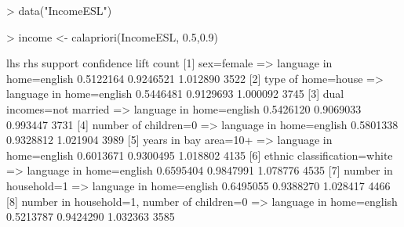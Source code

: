 \documentclass [a4paper] {article}
\begin{document}
\begin{Schunk}
\begin{Sinput}
> data("IncomeESL")
\end{Sinput}
\end{Schunk}
\begin{Schunk}
\begin{Sinput}
> income <- calapriori(IncomeESL, 0.5,0.9)
\end{Sinput}
\begin{Soutput}
    lhs                              rhs                          support confidence     lift count
[1] {sex=female}                  => {language in home=english} 0.5122164  0.9246521 1.012890  3522
[2] {type of home=house}          => {language in home=english} 0.5446481  0.9129693 1.000092  3745
[3] {dual incomes=not married}    => {language in home=english} 0.5426120  0.9069033 0.993447  3731
[4] {number of children=0}        => {language in home=english} 0.5801338  0.9328812 1.021904  3989
[5] {years in bay area=10+}       => {language in home=english} 0.6013671  0.9300495 1.018802  4135
[6] {ethnic classification=white} => {language in home=english} 0.6595404  0.9847991 1.078776  4535
[7] {number in household=1}       => {language in home=english} 0.6495055  0.9388270 1.028417  4466
[8] {number in household=1,                                                                        
     number of children=0}        => {language in home=english} 0.5213787  0.9424290 1.032363  3585
\end{Soutput}
\end{Schunk}
\end{document}
